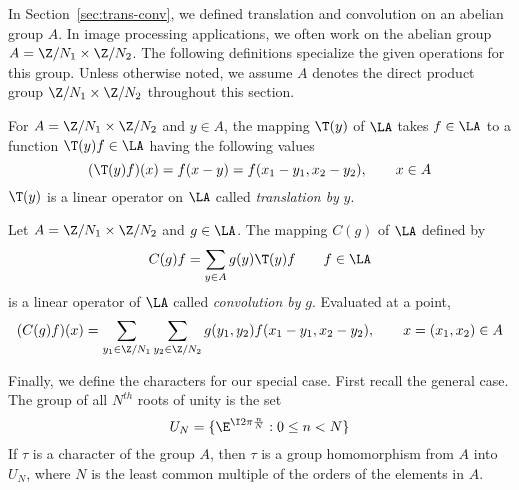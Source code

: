 In Section~\ref{sec:trans-conv}, we defined translation and convolution on 
an abelian group $A$.  In image processing applications, we often work 
on the abelian group $A = \Z/N_1 \times \Z/N_2$. 
The following definitions specialize the given operations for this group.
Unless otherwise noted, we assume $A$ denotes the direct product group 
$\Z/N_1 \times \Z/N_2$ throughout this section.
\begin{definition}[Translation by $y \in A$] %
For $A = \Z/N_1 \times \Z/N_2$ and $y \in A$, the mapping $\T(y)$ of 
$\LA$ %
takes 
$f \in \LA$ %
to a function 
$\T(y)f \in \LA$ %
having the following values
\[
(\T(y)f)(x) = f(x-y) = f(x_1-y_1, x_2-y_2), \qquad x \in 
A %
\]
$\T(y)$ is a linear operator on 
$\LA$ %
called \emph{translation by} $y$.
\end{definition}

\begin{definition}[Convolution by $g \in \LA$] %
Let $A = \Z/N_1 \times \Z/N_2$ and $g \in \LA$. The mapping $C(g)$ of 
$\LA$ %
defined by 
\[
C(g)f = \sum_{y \in A}g(y)\T(y)f \qquad f \in \LA
\]
is a linear operator of 
$\LA$ %
called \emph{convolution by} $g$.  Evaluated at a point,
\[
(C(g)f)(x) %
=\sum_{y_1\in \Z/N_1}\sum_{y_2\in \Z/N_2}g(y_1,y_2)f(x_1-y_1,x_2-y_2),
\qquad  x = (x_1,x_2) \in 
A %
\]
\end{definition}

Finally, we define the characters for our special case.
First recall the general case. The group of all $N^{th}$ roots of unity is
the set
\[
U_N = \{\E^{\I 2\pi \frac{n}{N}}: 0 \leq n < N \}
\]
If $\tau$ is a character of the group $A$, then $\tau$ is a group homomorphism
from $A$ into $U_N$, where $N$ is the least common multiple of the orders of
the elements in $A$. 

